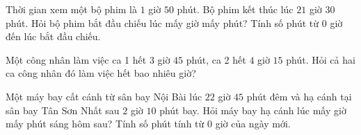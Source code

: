 \begin{ex} %
Thời gian xem một bộ phim là $1$ giờ $50$ phút. Bộ phim kết thúc lúc $21$ giờ $30$ phút. Hỏi bộ phim bắt đầu chiếu lúc mấy giờ mấy phút? Tính số phút từ $0$ giờ đến lúc bắt đầu chiếu.
\end{ex}

\begin{ex} %
Một công nhân làm việc ca 1 hết $3$ giờ $45$ phút, ca 2 hết $4$ giờ $15$ phút. Hỏi cả hai ca công nhân đó làm việc hết bao nhiêu giờ?
\end{ex}

\begin{ex} %
Một máy bay cất cánh từ sân bay Nội Bài lúc $22$ giờ $45$ phút đêm và hạ cánh tại sân bay Tân Sơn Nhất sau $2$ giờ $10$ phút bay. Hỏi máy bay hạ cánh lúc mấy giờ mấy phút sáng hôm sau? Tính số phút tính từ $0$ giờ của ngày mới.
\end{ex}
